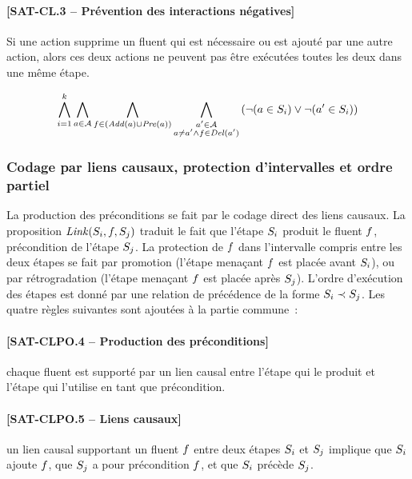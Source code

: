 {\paragraph*{[SAT-CL.3 -- Prévention des interactions négatives]}
Si une action supprime un fluent qui est nécessaire ou est ajouté par une autre action, alors ces deux actions ne peuvent pas être exécutées toutes les deux dans une même étape.

\begin{small}
\[
\bigwedge\limits_{\substack{i=1}}^{k}\bigwedge\limits_{\substack{\substack{a\in \mathcal{A}}}}\bigwedge\limits_{\substack{\substack{f\in \left(\mathit{Add}(a)\cup\mathit{Pre}(a)\right)}}}\bigwedge\limits_{\substack{\substack{a'\in \mathcal{A}\\a \neq a' \wedge f \in \mathit{Del}(a')}}}\left(\neg (a \in S_{i}) \vee \neg (a' \in S_{i})\right)
\]
\end{small}

\subsubsection{Codage par liens causaux, protection d'intervalles et ordre partiel}

La production des préconditions se fait par le codage direct des liens causaux.
La proposition $\mathit{Link}(S_{i},f,S_{j})$ traduit le fait que l'étape $S_{i}$ produit le fluent
$f$, précondition de l'étape $S_{j}$. La protection de $f$ dans l'intervalle compris
entre les deux étapes se fait par promotion (l'étape menaçant $f$ est placée
avant $S_{i}$), ou par rétrogradation (l'étape menaçant $f$ est placée après $S_{j}$).
L'ordre d'exécution des étapes  est donné par une relation de précédence de
la forme $S_{i} \prec S_{j}$. Les quatre règles suivantes sont ajoutées à la partie commune~:

\paragraph*{[SAT-CLPO.4 -- Production des préconditions]} chaque fluent est supporté par un lien
  causal entre l'étape qui le produit et l'étape
  qui l'utilise en tant que précondition.
\paragraph*{[SAT-CLPO.5 -- Liens causaux]} un lien causal supportant un fluent $f$ entre
  deux étapes $S_{i}$ et $S_{j}$ implique que $S_{i}$ ajoute $f$, que $S_{j}$ a pour
  précondition $f$, et que $S_{i}$ précède $S_{j}$.
}
